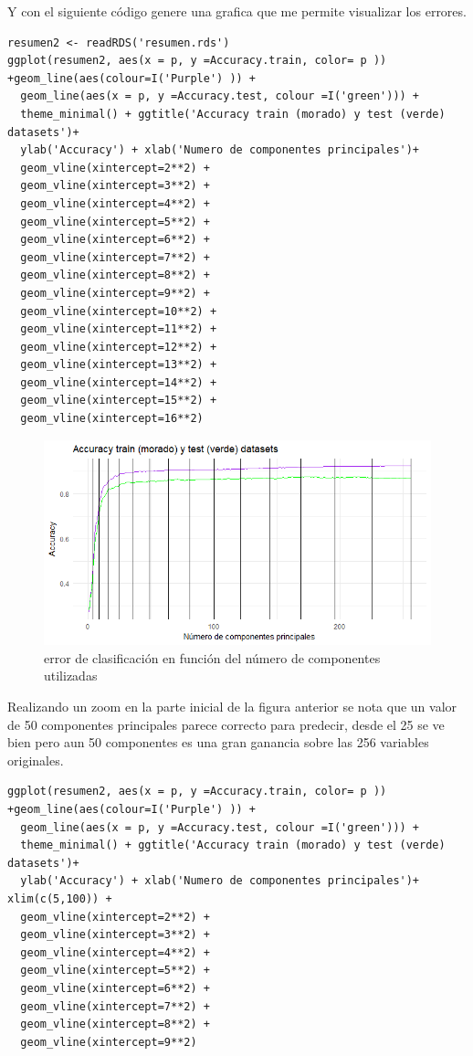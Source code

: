 \documentclass[paper=letter, fontsize=11pt]{scrartcl}
\numberwithin{equation}{section} %
\numberwithin{figure}{section} %
\numberwithin{table}{section} %
\begin{document}
\begin{enumerate}
Y con el siguiente código genere una grafica que me permite visualizar los errores.
\begin{lstlisting}[style=customc,basicstyle=\scriptsize]
resumen2 <- readRDS('resumen.rds')
ggplot(resumen2, aes(x = p, y =Accuracy.train, color= p )) +geom_line(aes(colour=I('Purple') )) +
  geom_line(aes(x = p, y =Accuracy.test, colour =I('green'))) +
  theme_minimal() + ggtitle('Accuracy train (morado) y test (verde) datasets')+
  ylab('Accuracy') + xlab('Numero de componentes principales')+
  geom_vline(xintercept=2**2) + 
  geom_vline(xintercept=3**2) +
  geom_vline(xintercept=4**2) +
  geom_vline(xintercept=5**2) +
  geom_vline(xintercept=6**2) +
  geom_vline(xintercept=7**2) +
  geom_vline(xintercept=8**2) +
  geom_vline(xintercept=9**2) +
  geom_vline(xintercept=10**2) +
  geom_vline(xintercept=11**2) +
  geom_vline(xintercept=12**2) +
  geom_vline(xintercept=13**2) +
  geom_vline(xintercept=14**2) +
  geom_vline(xintercept=15**2) +
  geom_vline(xintercept=16**2) 
\end{lstlisting} 

\FloatBarrier
\begin{figure}[H]
  \begin{center}
    \includegraphics[scale=.7]{error.png}
    \caption{error de clasificación en función del número de componentes utilizadas}
    \label{fig:errroes_PCR}
  \end{center}
\end{figure}

Realizando un zoom en la parte inicial de la figura anterior se nota que un valor de 50 componentes principales parece correcto para predecir, desde el 25 se ve bien pero aun 50 componentes es una gran ganancia sobre las 256 variables originales.

\begin{lstlisting}[style=customc,basicstyle=\scriptsize]
ggplot(resumen2, aes(x = p, y =Accuracy.train, color= p )) +geom_line(aes(colour=I('Purple') )) +
  geom_line(aes(x = p, y =Accuracy.test, colour =I('green'))) +
  theme_minimal() + ggtitle('Accuracy train (morado) y test (verde) datasets')+
  ylab('Accuracy') + xlab('Numero de componentes principales')+ xlim(c(5,100)) +
  geom_vline(xintercept=2**2) + 
  geom_vline(xintercept=3**2) +
  geom_vline(xintercept=4**2) +
  geom_vline(xintercept=5**2) +
  geom_vline(xintercept=6**2) +
  geom_vline(xintercept=7**2) +
  geom_vline(xintercept=8**2) +
  geom_vline(xintercept=9**2)
\end{lstlisting} 


\end{enumerate}
\end{document}
